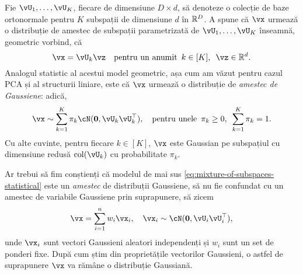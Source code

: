 \documentclass[../../book-main_ro.tex]{subfiles}
\begin{document}
Fie $\vU_1, \dots, \vU_K$, fiecare de dimensiune $D \times d$, să denoteze o colecție de baze ortonormale pentru $K$ subspații de dimensiune $d$ în $\mathbb{R}^D$.
A spune că $\vx$ urmează o distribuție de amestec de subspații parametrizată de $\vU_1, \dots, \vU_K$ înseamnă, geometric vorbind,
că 
\begin{equation}\label{eq:mixture-of-subspaces-geometric}
    \vx = \vU_k \vz  \quad \text{pentru un anumit} \enspace k \in [K],\enspace \vz \in \R^d.
\end{equation}
Analogul statistic al acestui model geometric, așa cum am văzut pentru cazul PCA și al structurii liniare,
este că $\vx$ urmează o distribuție de \textit{amestec de Gaussiene}: adică,
\begin{equation}\label{eq:mixture-of-subspaces-statistical}
    \vx \sim \sum_{k=1}^K \pi_k \cN(\mathbf{0}, \vU_k\vU_k^\top), \quad \text{pentru unele} \enspace \pi_k \geq 0,\enspace \sum_{k=1}^K \pi_k = 1.
\end{equation}
Cu alte cuvinte, pentru fiecare $k \in [K]$, $\vx$ este Gaussian pe subspațiul cu dimensiune redusă
$\mathop{\mathrm{col}}(\vU_k)$ cu probabilitate $\pi_k$.

\begin{remark}
Ar trebui să fim conștienți că modelul de mai sus
    \eqref{eq:mixture-of-subspaces-statistical} este un \textit{amestec} de
    distribuții Gaussiene, să nu fie confundat cu un amestec de
    variabile Gaussiene prin suprapunere, să zicem 
\begin{equation}
    \vx = \sum_{i=1}^n w_i \vx_i, \quad \vx_i \sim \cN(\mathbf{0}, \vU_i\vU_i^\top),
\end{equation}
unde $\vx_i$ sunt vectori Gaussieni aleatori independenți și $w_i$ sunt un set de ponderi fixe. După cum știm din proprietățile vectorilor Gaussieni, o astfel de suprapunere $\vx$ va rămâne o distribuție Gaussiană.
\end{remark}
\end{document}
